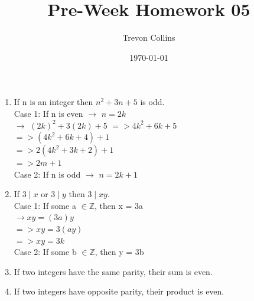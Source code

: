 \documentclass{article}
\title{Pre-Week Homework 05}
\author{Trevon Collins}
\date{\today}
\begin{document}
\maketitle

\begin{enumerate}
    \item If n is an integer then $n^{2}+3n+5$ is odd.\\
    \quad Case 1: If n is even $\rightarrow$ $n=2k$\\
    \quad \quad $\rightarrow$ $(2k)^{2} + 3(2k) + 5$
        $=> 4k^{2} + 6k + 5$\\
        $=> (4k^{2} + 6k + 4) + 1$\\
        $=> 2(4k^{2} + 3k + 2) + 1$\\
        $=> \boxed{2m + 1}$ \\
    \quad Case 2: If n is odd $\rightarrow$ $n=2k+1$
    \item If $3\mid x$ or $3 \mid y$ then $3 \mid xy$.\\
    \quad Case 1: If some a $\in \mathbb{Z}$, then x = 3a \\
        $\rightarrow xy = (3a)y $\\
        $=> xy = 3(ay)$\\
        $=> \boxed{xy = 3k}$\\
    \quad Case 2: If some b $\in \mathbb{Z}$, then y = 3b \\
    \item If two integers have the same parity, their sum is even.
    \item If two integers have opposite parity, their product is even.
\end{enumerate}
\end{document}
